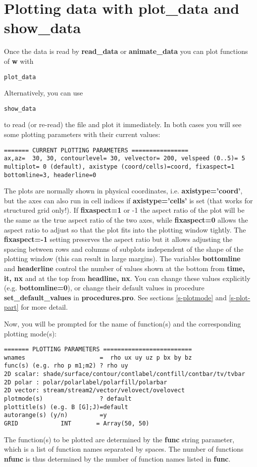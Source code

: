 \documentclass{article}
\begin{document}
\section{Plotting data with plot\_data and show\_data \label{s-plot_data}}

Once the data is read by {\bf read\_data} or {\bf animate\_data} you can plot 
functions of {\bf w} with
\begin{verbatim}
plot_data
\end{verbatim}
Alternatively, you can use
\begin{verbatim}
show_data
\end{verbatim}
to read (or re-read) the file and plot it immediately. In both cases
you will see some plotting parameters with their current values:
\begin{verbatim}
======= CURRENT PLOTTING PARAMETERS ================
ax,az=  30, 30, contourlevel= 30, velvector= 200, velspeed (0..5)= 5
multiplot= 0 (default), axistype (coord/cells)=coord, fixaspect=1
bottomline=3, headerline=0
\end{verbatim}
The plots are normally shown in physical coordinates, i.e.
{\bf axistype='coord'}, but the axes can also run in cell indices 
if {\bf axistype='cells'} is set (that works for structured grid only!).
If {\bf fixaspect=1} or -1 the aspect ratio of the plot will be the same
as the true aspect ratio of the two axes, while {\bf fixaspect=0} allows
the aspect ratio to adjust so that 
the plot fits into the plotting window tightly. The {\bf fixaspect=-1}
setting preserves the aspect ratio but it allows adjusting the spacing 
between rows and columns of subplots independent of the shape
of the plotting window (this can result in large margins).
The variables {\bf bottomline} and {\bf headerline} control the number
of values shown at the bottom from {\bf time, it, nx} and at the top 
from {\bf headline, nx}.
You can change these values explicitly (e.g. {\bf bottomline=0}), or change 
their default values in procedure {\bf set\_default\_values} in {\bf procedures.pro}. 
See sections \ref{s-plotmode} and \ref{s-plot-part} for more detail.

Now, you will be prompted 
for the name of function(s) and the corresponding plotting mode(s):
\begin{verbatim}
======= PLOTTING PARAMETERS =========================
wnames                     =  rho ux uy uz p bx by bz
func(s) (e.g. rho p m1;m2) ? rho uy
2D scalar: shade/surface/contour/contlabel/contfill/contbar/tv/tvbar
2D polar : polar/polarlabel/polarfill/polarbar
2D vector: stream/stream2/vector/velovect/ovelovect
plotmode(s)                ? default
plottitle(s) (e.g. B [G];J)=default
autorange(s) (y/n)         =y
GRID            INT       = Array(50, 50)
\end{verbatim}
The function(s) to be plotted are determined by the {\bf func}
string parameter, which is a list of function names separated by spaces.
The number of functions {\bf nfunc} is thus determined by the number of
function names listed in {\bf func}. 
\end{document}
